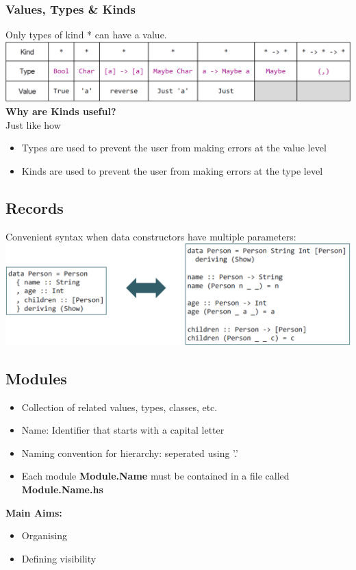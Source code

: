 \subsubsection{Values, Types \& Kinds}
Only types of kind * can have a value.\\
\includegraphics[width=\linewidth]{img/values_types_kinds.png}
\textbf{Why are Kinds useful?}\\
Just like how
\begin{itemize}
    \item Types are used to prevent the user from making errors at the value level
    \item Kinds are used to prevent the user from making errors at the type level
\end{itemize}

\subsection{Records}
Convenient syntax when data constructors have multiple parameters:\\
\includegraphics[width=\linewidth]{img/records.png}

\subsection{Modules}
\begin{itemize}
    \item Collection of related values, types, classes, etc.
    \item Name: Identifier that starts with a capital letter
    \item Naming convention for hierarchy: seperated using '.'
    \item Each module \textbf{Module.Name} must be contained in a file called \textbf{Module.Name.hs}
\end{itemize}
\textbf{Main Aims:}
\begin{itemize}
    \item Organising
    \item Defining visibility
\end{itemize}

